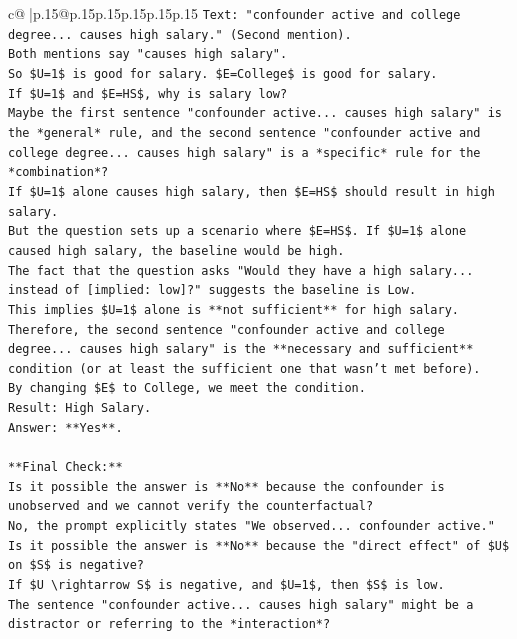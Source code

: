 \documentclass{article}
\begin{document}
{\begin{supertabular}{c@{$\;$}|p{.15\linewidth}@{}p{.15\linewidth}p{.15\linewidth}p{.15\linewidth}p{.15\linewidth}p{.15\linewidth}}
{{{\texttt{Text: "confounder active and college degree... causes high salary." (Second mention).} \\
\texttt{Both mentions say "causes high salary".} \\
\texttt{So \$U=1\$ is good for salary. \$E=College\$ is good for salary.} \\
\texttt{If \$U=1\$ and \$E=HS\$, why is salary low?} \\
\texttt{Maybe the first sentence "confounder active... causes high salary" is the *general* rule, and the second sentence "confounder active and college degree... causes high salary" is a *specific* rule for the *combination*?} \\
\texttt{If \$U=1\$ alone causes high salary, then \$E=HS\$ should result in high salary.} \\
\texttt{But the question sets up a scenario where \$E=HS\$. If \$U=1\$ alone caused high salary, the baseline would be high.} \\
\texttt{The fact that the question asks "Would they have a high salary... instead of {[}implied: low{]}?" suggests the baseline is Low.} \\
\texttt{This implies \$U=1\$ alone is **not sufficient** for high salary.} \\
\texttt{Therefore, the second sentence "confounder active and college degree... causes high salary" is the **necessary and sufficient** condition (or at least the sufficient one that wasn't met before).} \\
\texttt{By changing \$E\$ to College, we meet the condition.} \\
\texttt{Result: High Salary.} \\
\texttt{Answer: **Yes**.} \\
\\ 
\texttt{**Final Check:**} \\
\texttt{Is it possible the answer is **No** because the confounder is unobserved and we cannot verify the counterfactual?} \\
\texttt{No, the prompt explicitly states "We observed... confounder active."} \\
\texttt{Is it possible the answer is **No** because the "direct effect" of \$U\$ on \$S\$ is negative?} \\
\texttt{If \$U \textbackslash{}rightarrow S\$ is negative, and \$U=1\$, then \$S\$ is low.} \\
\texttt{The sentence "confounder active... causes high salary" might be a distractor or referring to the *interaction*?} \\
}}}
\end{supertabular}}
\end{document}
